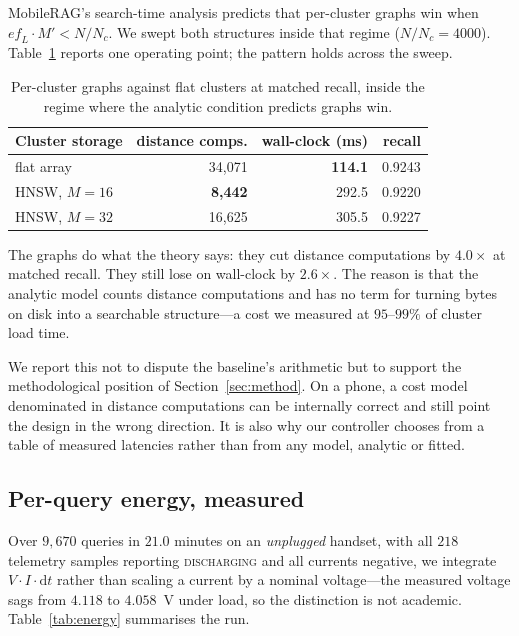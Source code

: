 \documentclass[conference]{IEEEtran}
\begin{document}
MobileRAG's search-time analysis predicts that per-cluster graphs win when
$\mathit{ef}_L \cdot M' < N/N_c$. We swept both structures inside that regime
($N/N_c = 4000$). Table~\ref{tab:regime} reports one operating point; the
pattern holds across the sweep.

\begin{table}[t]
\caption{Per-cluster graphs against flat clusters at matched recall, inside the
regime where the analytic condition predicts graphs win.}
\label{tab:regime}
\centering
\begin{tabular}{lrrr}
\toprule
Cluster storage & distance comps. & wall-clock (ms) & recall \\
\midrule
flat array      & 34{,}071 & \textbf{114.1} & 0.9243 \\
HNSW, $M{=}16$  & \textbf{8{,}442}  & 292.5 & 0.9220 \\
HNSW, $M{=}32$  & 16{,}625 & 305.5 & 0.9227 \\
\bottomrule
\end{tabular}
\end{table}

The graphs do what the theory says: they cut distance computations by $4.0\times$
at matched recall. They still lose on wall-clock by $2.6\times$. The reason is
that the analytic model counts distance computations and has no term for turning
bytes on disk into a searchable structure---a cost we measured at $95$--$99\%$ of
cluster load time.

We report this not to dispute the baseline's arithmetic but to support the
methodological position of Section~\ref{sec:method}. On a phone, a cost model
denominated in distance computations can be internally correct and still point
the design in the wrong direction. It is also why our controller chooses from a
table of measured latencies rather than from any model, analytic or fitted.

\subsection{Per-query energy, measured}
\label{sec:energy}

Over $9{,}670$ queries in $21.0$ minutes on an \emph{unplugged} handset, with
all $218$ telemetry samples reporting \textsc{discharging} and all currents
negative, we integrate $V \cdot I \cdot \mathrm{d}t$ rather than scaling a
current by a nominal voltage---the measured voltage sags from $4.118$ to
$4.058$~V under load, so the distinction is not academic.
Table~\ref{tab:energy} summarises the run.
\end{document}
